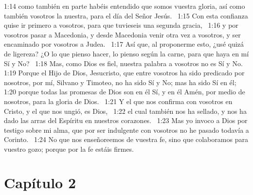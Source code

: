 1:14 como también en parte habéis entendido que somos vuestra gloria, así como también vosotros la nuestra, para el día del Señor Jesús.  
1:15 Con esta confianza quise ir primero a vosotros, para que tuvieseis una segunda gracia,  
1:16 y por vosotros pasar a Macedonia, y desde Macedonia venir otra vez a vosotros, y ser encaminado por vosotros a Judea.  
1:17 Así que, al proponerme esto, ¿usé quizá de ligereza? ¿O lo que pienso hacer, lo pienso según la carne, para que haya en mí Sí y No?  
1:18 Mas, como Dios es fiel, nuestra palabra a vosotros no es Sí y No.  
1:19 Porque el Hijo de Dios, Jesucristo, que entre vosotros ha sido predicado por nosotros, por mí, Silvano y Timoteo, no ha sido Sí y No; mas ha sido Sí en él;  
1:20 porque todas las promesas de Dios son en él Sí, y en él Amén, por medio de nosotros, para la gloria de Dios.  
1:21 Y el que nos confirma con vosotros en Cristo, y el que nos ungió, es Dios,  
1:22 el cual también nos ha sellado, y nos ha dado las arras del Espíritu en nuestros corazones.  
1:23 Mas yo invoco a Dios por testigo sobre mi alma, que por ser indulgente con vosotros no he pasado todavía a Corinto.  
1:24 No que nos enseñoreemos de vuestra fe, sino que colaboramos para vuestro gozo; porque por la fe estáis firmes.  
\section*{Capítulo 2 }

